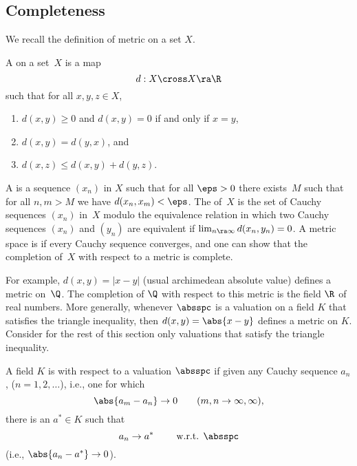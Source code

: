 \documentclass[11pt]{book}
\begin{document}
\begin{ch}
\section{Completeness}\label{sec:completeness}
We recall the definition of metric on a set $X$.
\begin{definition}[Metric]\label{defn:metric}
A  on a set~$X$ is a map
$$
  d : X \cross X \ra \R
$$
such that for all $x,y,z\in X$,
\begin{enumerate}
\item $d(x,y)\geq 0$ and $d(x,y)=0$ if and only if $x=y$,
\item $d(x,y)=d(y,x)$, and
\item $d(x,z)\leq d(x,y)+d(y,z)$.
\end{enumerate}
\end{definition}
A  is a sequence
$(x_n)$ in $X$ such that for all $\eps>0$ there exists~$M$ such that
for all $n,m>M$ we have $d(x_n,x_m)<\eps$.  The 
of~$X$ is the set of Cauchy sequences $(x_n)$ in~$X$ modulo the
equivalence relation in which two Cauchy sequences $(x_n)$ and $(y_n)$
are equivalent if $\lim_{n\ra\infty} d(x_n,y_n)=0$.  A metric space is
 if every Cauchy sequence converges,
and one can show that the completion of~$X$ with respect to a metric
is complete.

For example, $d(x,y)=|x-y|$ (usual archimedean absolute value) defines
a metric on~$\Q$.  The completion of $\Q$ with respect to this metric
is the field $\R$ of real numbers.  More generally, whenever $\absspc$
is a valuation on a field $K$ that satisfies the triangle inequality,
then $d(x,y)=\abs{x-y}$ defines a metric on $K$.
Consider for the rest of this section only valuations that
satisfy the triangle inequality.

\begin{definition}[Complete]
A field $K$ is  with respect to a valuation $\absspc$
if given any Cauchy sequence $a_n$, ($n=1,2,\ldots$), i.e.,
one for which
$$
\abs{a_m - a_n} \to 0 \qquad(m,n\to \infty,\infty),
$$
there is an $a^*\in K$ such that
$$
  a_n \to a^* \qquad \text{ w.r.t. }\absspc
$$
(i.e., $\abs{a_n-a^*}\to 0$).
\end{definition}


\end{ch}
\end{document}
